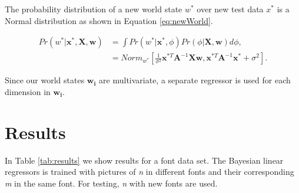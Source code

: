 \documentclass[12pt]{article}
\begin{document}
The probability distribution of a new world state $w^*$ over new test data $x^*$ is a Normal distribution as shown in Equation \ref{eq:newWorld}.

\begin{equation}
\begin{split}
\label{eq:newWorld}
Pr(w^* | \mathbf{x}^*, \mathbf{X}, \mathbf{w}) &= \int Pr(w^* | \mathbf{x}^*, \phi) Pr(\phi | \mathbf{X}, \mathbf{w} ) d \phi,\\
 &= Norm_{w^*} \left[ \frac{1}{\sigma^2} \mathbf{x}^{*T} \mathbf{A}^{-1} \mathbf{X} \mathbf{w}, \mathbf{x}^{*T} \mathbf{A}^{-1} \mathbf{x}^* + \sigma^2  \right].
\end{split}
\end{equation}

Since our world states $\mathbf{w_i}$ are multivariate, a separate regressor is used for each dimension in  $\mathbf{w_i}$.

\section{Results}

In Table \ref{tab:results} we show results for a font data set.
The Bayesian linear regressors is trained with pictures of \emph{n} in different fonts and their corresponding \emph{m} in the same font.
For testing, \emph{n} with new fonts are used.
\end{document}
